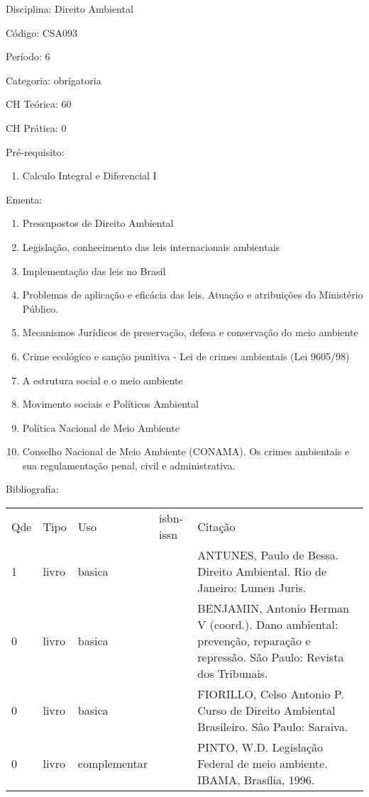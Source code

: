 \documentclass[12pt,a4paper,twoside]{report}
\begin{document}
Disciplina: Direito Ambiental

Código: CSA093

Período: 6

Categoria: obrigatoria

CH Teórica: 60

CH Prática: 0




Pré-requisito:
\begin{enumerate}
\item Calculo Integral e Diferencial I
\end{enumerate}

Ementa:
\begin{enumerate}
\item Pressupostos de Direito Ambiental
\item Legislação, conhecimento das leis internacionais ambientais
\item Implementação das leis no Brasil
\item Problemas de aplicação e eficácia das leis. Atuação e atribuições do Ministério Público.
\item Mecanismos Jurídicos de preservação, defesa e conservação do meio ambiente
\item Crime ecológico e sanção punitiva - Lei de crimes ambientais (Lei 9605/98)
\item A estrutura social e o meio ambiente
\item Movimento sociais e Políticos Ambiental
\item Política Nacional de Meio Ambiente
\item Conselho Nacional de Meio Ambiente (CONAMA). Os crimes ambientais e sua regulamentação penal, civil e administrativa.
\end{enumerate}



Bibliografia:


\begin{tabular}{llllp{8cm}}
Qde & Tipo & Uso & isbn-issn & Citação \\
1&livro&basica&&ANTUNES, Paulo de Bessa. Direito Ambiental. Rio de Janeiro: Lumen Juris.\\
0&livro&basica&&BENJAMIN, Antonio Herman V (coord.). Dano ambiental: prevenção, reparação e repressão. São Paulo: Revista dos Tribunais.\\
0&livro&basica&&FIORILLO, Celso Antonio P. Curso de Direito Ambiental Brasileiro. São Paulo: Saraiva.\\
0&livro&complementar&&PINTO, W.D. Legislação Federal de meio ambiente. IBAMA, Brasília, 1996.\\
\end{tabular}
\end{document}

